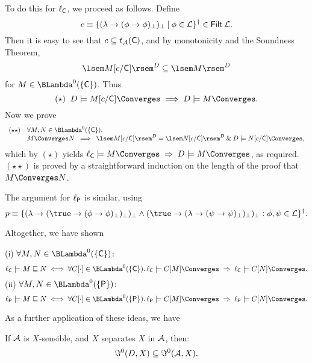 To do this for $\ell_{\sf C}$, we proceed as follows. Define
\[ c \equiv \{ (\lambda \rightarrow ( \phi \rightarrow \phi )_{\bot} )_{\bot} \: | \: \phi \in {\cal L} \}^{\dag} \in {\sf Filt} \: {\cal L}. \]
Then it is easy to see that $c \subseteq t_{\cal A}({\sf C})$, and by monotonicity and the Soundness Theorem,
\[ \lsem M[c / {\sf C} ] \rsem^{D} \subseteq \lsem M \rsem^{D} \]
for $M \in \BLambda^{0}(\{ {\sf C} \} )$. Thus
\[ (\star) \;\; D \models M [ c / {\sf C} ] \Converges \; \Longrightarrow \; D \models M \Converges . \]
Now we prove
\[ \begin{array}{cl}
(\star \star ) & \forall M, N \in {\BLambda}^{0}(\{ {\sf C} \} ) . \\ 
& M \Converges N \;\; \Longrightarrow \;\;
\lsem M [ c / {\sf C} ] \rsem^{D} = \lsem N [ c / {\sf C} ] \rsem^{D} \: \& \: D \models N [ c / {\sf C} ] \Converges , 
\end{array} \]
which by $(\star )$ yields   $\ell_{\sf C} \models M \Converges \; \Rightarrow \; D \models M \Converges$, as required. $(\star \star )$ is proved by a straightforward induction on the length of the proof that $M \Converges N$.

The argument for $\ell_{\sf P}$ is similar, using
\[ p \equiv \{ (\lambda \rightarrow (\true \rightarrow (\phi \rightarrow \phi )_{\bot} )_{\bot} )_{\bot} \wedge (\true \rightarrow (\lambda \rightarrow (\psi \rightarrow \psi )_{\bot} )_{\bot} )_{\bot} : \phi , \psi \in {\cal L} \}^{\dag} . \]

Altogether, we have shown
\begin{theorem}
(i) $\forall M, N \in \BLambda^{0}(\{ {\sf C} \} )$:
\[ \ell_{\sf C} \models M \sqsubseteq N \; \Longleftrightarrow \; \forall C[\cdot ] \in {\BLambda}^{0}(\{ {\sf C} \} ). \, \ell_{\sf C} \models C[M] \Converges \; \Rightarrow \; \ell_{\sf C} \models C[N] \Converges . \]
(ii) $\forall M, N \in \BLambda^{0}(\{ {\sf P} \} )$:
\[ \ell_{\sf P} \models M \sqsubseteq N \; \Longleftrightarrow \; \forall C[\cdot ] \in {\BLambda}^{0}(\{ {\sf P} \} ). \, \ell_{\sf P} \models C[M] \Converges \; \Rightarrow \; \ell_{\sf P} \models C[N] \Converges . \]
\end{theorem}

As a further application of these ideas, we have
\begin{proposition}[Soundness of D]
If $\cal A$ is $X$-sensible, and $X$ separates $X$ in $\cal A$, then:
\[ {\Im}^{0}(D, X) \subseteq {\Im}^{0}({\cal A}, X) . \]
\end{proposition}

